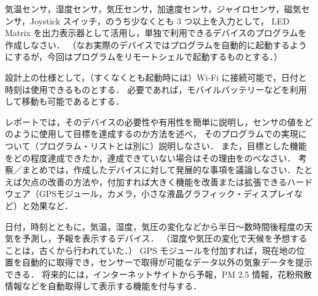 \documentclass[11pt,a4,epsf]{article}
\begin{document}
\begin{subject}
気温センサ，湿度センサ，気圧センサ，加速度センサ，ジャイロセンサ，磁気センサ，Joystick スイッチ，のうち少なくとも 3 つ以上を入力として，
LED Matrix を出力表示器として活用し，単独で利用できるデバイスのプログラムを作成しなさい．
（なお実際のデバイスではプログラムを自動的に起動するようにするが，今回はプログラムをリモートシェルで起動するものとする．）

設計上の仕様として，（すくなくとも起動時には）Wi-Fi に接続可能で，日付と時刻は使用できるものとする．
必要であれば，モバイルバッテリーなどを利用して移動も可能であるとする．

レポートでは，そのデバイスの必要性や有用性を簡単に説明し，センサの値をどのように使用して目標を達成するのか方法を述べ，
そのプログラムでの実現について（プログラム・リストとは別に）説明しなさい．
また，目標とした機能をどの程度達成できたか，達成できていない場合はその理由をのべなさい．
考察／まとめでは，作成したデバイスに対して発展的な事項を議論しなさい．たとえば欠点の改善の方法や，付加すれば大きく機能を改善または拡張できるハードウェア（GPSモジュール，カメラ，小さな液晶グラフィック・ディスプレイなど）と効果など．
\end{subject}

\begin{example}
日付，時刻とともに，気温，湿度，気圧の変化などから半日〜数時間後程度の天気を予測し，予報を表示するデバイス．
（湿度や気圧の変化で天候を予想することは，古くから行われていた．）
GPS モジュールを付加すれば，現在地の位置を自動的に取得でき，センサーで取得が可能なデータ以外の気象データを提示できる．
将来的には，インターネットサイトから予報，PM 2.5 情報，花粉飛散情報などを自動取得して表示する機能を付与する．
\end{example}
\end{document}
